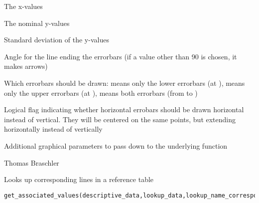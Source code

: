 \documentclass[a4paper]{book}
\begin{document}
\begin{Arguments}
\begin{ldescription}
\item[\code{x}] 
The x-values 

\item[\code{y}] 
The nominal y-values

\item[\code{sd\_y}] 
Standard deviation of the y-values

\item[\code{angle}] 
Angle for the line ending the errorbars (if a value other than 90 is chosen, it makes arrows)

\item[\code{code}] 
Which errorbars should be drawn:  means only the lower errorbars (at ),  means only the upper errorbars (at ),  means both errorbars (from  to )

\item[\code{horiz}] 
Logical flag indicating whether horizontal errobars should be drawn horizontal instead of vertical. They will be centered on the same points, but extending horizontally instead of vertically

\item[\code{...}] 
Additional graphical parameters to pass down to the underlying  function

\end{ldescription}
\end{Arguments}
%
\begin{Author}\relax
Thomas Braschler
\end{Author}
%
\begin{Description}\relax
Looks up corresponding lines in a reference table
\end{Description}
%
\begin{Usage}
\begin{verbatim}
get_associated_values(descriptive_data,lookup_data,lookup_name_correspondence=NULL,FUN=NULL,lookup_value_col=NULL,...)
\end{verbatim}
\end{Usage}
%
\end{document}

